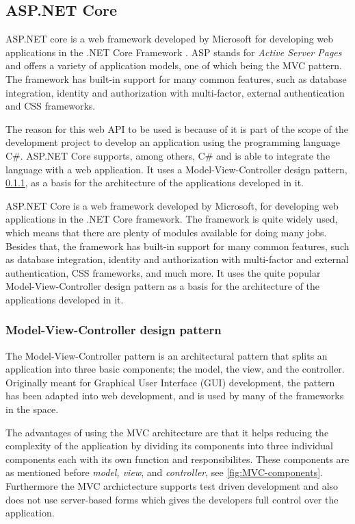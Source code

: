 \documentclass[../../master.tex]{subfiles}
\begin{document}
\subsection{ASP.NET Core} \label{sec:aspnetcore}

ASP.NET core is a web framework developed by Microsoft for developing web applications in the .NET Core Framework \cite{aspnetcore2}.
ASP stands for \textit{Active Server Pages} and offers a variety of application models, one of which being the MVC pattern.
The framework has built-in support for many common features, such as database integration, identity and authorization with multi-factor, external authentication and CSS frameworks.

The reason for this web API to be used is because of it is part of the scope of the development project to develop an application using the programming language C\#.
ASP.NET Core supports, among others, C\# and is able to integrate the language with a web application.
It uses a Model-View-Controller design pattern, \cref{sec:mvc}, as a basis for the architecture of the applications developed in it.

ASP.NET Core is a web framework developed by Microsoft, for developing web applications in the .NET Core framework.
The framework is quite widely used, which means that there are plenty of modules available for doing many jobs. Besides that, the framework has built-in support for many common features, such as database integration, identity and authorization with multi-factor and external authentication, CSS frameworks, and much more.
It uses the quite popular Model-View-Controller design pattern as a basis for the architecture of the applications developed in it.

\subsubsection{Model-View-Controller design pattern}\label{sec:mvc}
The Model-View-Controller pattern is an architectural pattern that splits an application into three basic components; the model, the view, and the controller.
Originally meant for Graphical User Interface (GUI) development, the pattern has been adapted into web development, and is used by many of the frameworks in the space. \cite{gangoffour}

The advantages of using the MVC architecture are that it helps reducing the complexity of the application by dividing its components into three individual components each with its own function and responsibilites.
These components are as mentioned before \textit{model, view}, and \textit{controller}, see \cref{fig:MVC-components}.
Furthermore the MVC archictecture supports test driven development and also does not use server-based forms which gives the developers full control over the application. \cite{mvcarticle}
\end{document}
